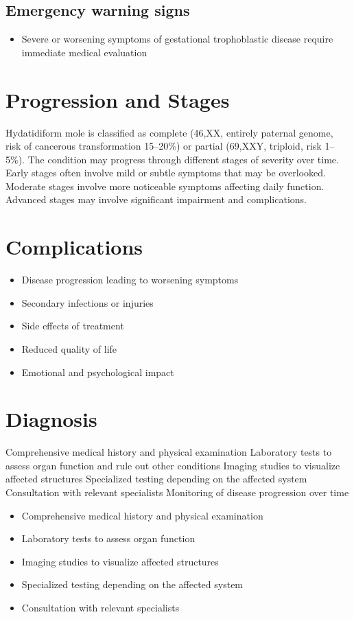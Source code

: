 \subsection{Emergency warning signs}
\begin{itemize}[noitemsep]
  \item Severe or worsening symptoms of gestational trophoblastic disease require immediate medical evaluation
\end{itemize}
\section{Progression and Stages}
Hydatidiform mole is classified as complete (46,XX, entirely paternal genome, risk of cancerous transformation 15--20\%) or partial (69,XXY, triploid, risk 1--5\%). The condition may progress through different stages of severity over time. Early stages often involve mild or subtle symptoms that may be overlooked. Moderate stages involve more noticeable symptoms affecting daily function. Advanced stages may involve significant impairment and complications.
\section{Complications}
\begin{itemize}[noitemsep]
  \item Disease progression leading to worsening symptoms
  \item Secondary infections or injuries
  \item Side effects of treatment
  \item Reduced quality of life
  \item Emotional and psychological impact
\end{itemize}
\section{Diagnosis}
Comprehensive medical history and physical examination Laboratory tests to assess organ function and rule out other conditions Imaging studies to visualize affected structures Specialized testing depending on the affected system Consultation with relevant specialists Monitoring of disease progression over time

\begin{itemize}[noitemsep]
  \item Comprehensive medical history and physical examination
  \item Laboratory tests to assess organ function
  \item Imaging studies to visualize affected structures
  \item Specialized testing depending on the affected system
  \item Consultation with relevant specialists
\end{itemize}

